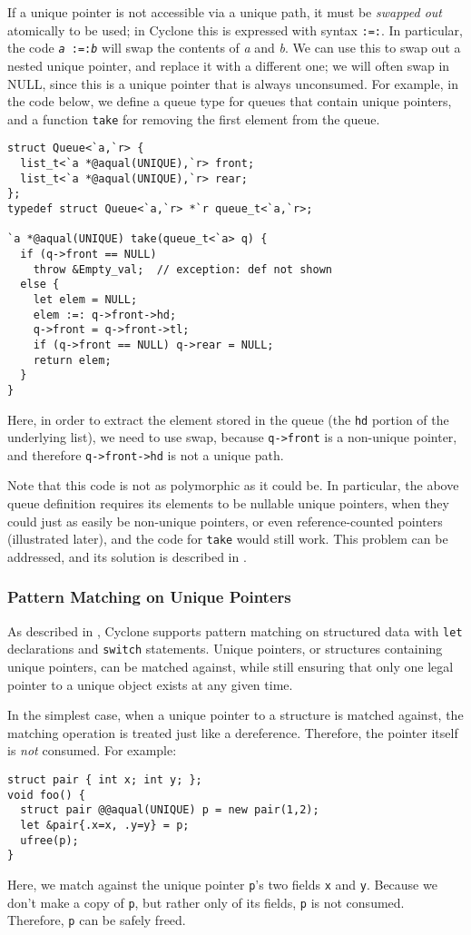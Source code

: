If a unique pointer is not accessible via a unique path, it must be
\emph{swapped out} atomically to be used; in Cyclone this is expressed with
syntax \texttt{:=:}.  In particular, the code \texttt{{\it a} :=:{\it b}}
will swap the contents of {\it a} and {\it b}.  We can use this to swap out
a nested unique pointer, and replace it with a different one; we will often
swap in NULL, since this is a unique pointer that is always unconsumed.  For
example, in the code below, we define a queue type for queues that contain
unique pointers, and a function \texttt{take} for removing the first element
from the queue.
\begin{verbatim}
struct Queue<`a,`r> { 
  list_t<`a *@aqual(UNIQUE),`r> front; 
  list_t<`a *@aqual(UNIQUE),`r> rear; 
};
typedef struct Queue<`a,`r> *`r queue_t<`a,`r>;

`a *@aqual(UNIQUE) take(queue_t<`a> q) {
  if (q->front == NULL)
    throw &Empty_val;  // exception: def not shown
  else {
    let elem = NULL;
    elem :=: q->front->hd;
    q->front = q->front->tl;
    if (q->front == NULL) q->rear = NULL;
    return elem;
  }
}
\end{verbatim}
Here, in order to extract the element stored in the queue (the \texttt{hd}
portion of the underlying list), we need to use swap, because
\texttt{q->front} is a non-unique pointer, and therefore
\texttt{q->front->hd} is not a unique path.

Note that this code is not as polymorphic as it could be.  In particular,
the above queue definition requires its elements to be nullable unique
pointers, when they could just as easily be non-unique pointers, or even
reference-counted pointers (illustrated later), and the code for
\texttt{take} would still work.  This problem can be addressed, and its
solution is described in .

\subsubsection{Pattern Matching on Unique Pointers}
\label{sec:unique-patterns}

As described in , Cyclone supports pattern
matching on structured data with \texttt{let} declarations and
\texttt{switch} statements.  Unique pointers, or structures containing
unique pointers, can be matched against, while still ensuring that only one
legal pointer to a unique object exists at any given time.

In the simplest case, when a unique pointer to a structure is matched
against, the matching operation is treated just like a dereference.
Therefore, the pointer itself is \emph{not} consumed.  For example:
\begin{verbatim}
struct pair { int x; int y; };
void foo() {
  struct pair @@aqual(UNIQUE) p = new pair(1,2);
  let &pair{.x=x, .y=y} = p;
  ufree(p);
}
\end{verbatim}
Here, we match against the unique pointer \texttt{p}'s two fields
\texttt{x} and \texttt{y}.  Because we don't make a copy of \texttt{p}, but
rather only of its fields, \texttt{p} is not consumed.  Therefore,
\texttt{p} can be safely freed.

